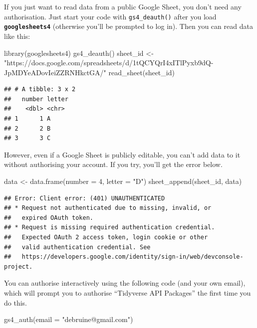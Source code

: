 \documentclass[
  oneside]{book}
\newenvironment{Shaded}{\begin{snugshade}}{\end{snugshade}}
\newcommand{\AttributeTok}[1]{\textcolor[rgb]{0.77,0.63,0.00}{#1}}
\newcommand{\DecValTok}[1]{\textcolor[rgb]{0.00,0.00,0.81}{#1}}
\newcommand{\FunctionTok}[1]{\textcolor[rgb]{0.00,0.00,0.00}{#1}}
\newcommand{\NormalTok}[1]{#1}
\newcommand{\OtherTok}[1]{\textcolor[rgb]{0.56,0.35,0.01}{#1}}
\newcommand{\StringTok}[1]{\textcolor[rgb]{0.31,0.60,0.02}{#1}}
\begin{document}
If you just want to read data from a public Google Sheet, you don't need any authorisation. Just start your code with \texttt{gs4\_deauth}\texttt{()} after you load \textbf{\texttt{googlesheets4}} (otherwise you'll be prompted to log in). Then you can read data like this:

\begin{Shaded}
\begin{Highlighting}[]
\FunctionTok{library}\NormalTok{(googlesheets4)}
\FunctionTok{gs4\_deauth}\NormalTok{()}
\NormalTok{sheet\_id }\OtherTok{\textless{}{-}} \StringTok{"https://docs.google.com/spreadsheets/d/1tQCYQrI4xITlPyxb9dQ{-}JpMDYeADovIeiZZRNHkctGA/"}
\FunctionTok{read\_sheet}\NormalTok{(sheet\_id)}
\end{Highlighting}
\end{Shaded}

\begin{verbatim}
## # A tibble: 3 x 2
##   number letter
##    <dbl> <chr> 
## 1      1 A     
## 2      2 B     
## 3      3 C
\end{verbatim}

However, even if a Google Sheet is publicly editable, you can't add data to it without authorising your account. If you try, you'll get the error below.

\begin{Shaded}
\begin{Highlighting}[]
\NormalTok{data }\OtherTok{\textless{}{-}} \FunctionTok{data.frame}\NormalTok{(}\AttributeTok{number =} \DecValTok{4}\NormalTok{, }\AttributeTok{letter =} \StringTok{"D"}\NormalTok{)}
\FunctionTok{sheet\_append}\NormalTok{(sheet\_id, data)}
\end{Highlighting}
\end{Shaded}

\begin{verbatim}
## Error: Client error: (401) UNAUTHENTICATED
## * Request not authenticated due to missing, invalid, or
##   expired OAuth token.
## * Request is missing required authentication credential.
##   Expected OAuth 2 access token, login cookie or other
##   valid authentication credential. See
##   https://developers.google.com/identity/sign-in/web/devconsole-project.
\end{verbatim}

You can authorise interactively using the following code (and your own email), which will prompt you to authorise ``Tidyverse API Packages'' the first time you do this.

\begin{Shaded}
\begin{Highlighting}[]
\FunctionTok{gs4\_auth}\NormalTok{(}\AttributeTok{email =} \StringTok{"debruine@gmail.com"}\NormalTok{)}
\end{Highlighting}
\end{Shaded}
\end{document}
